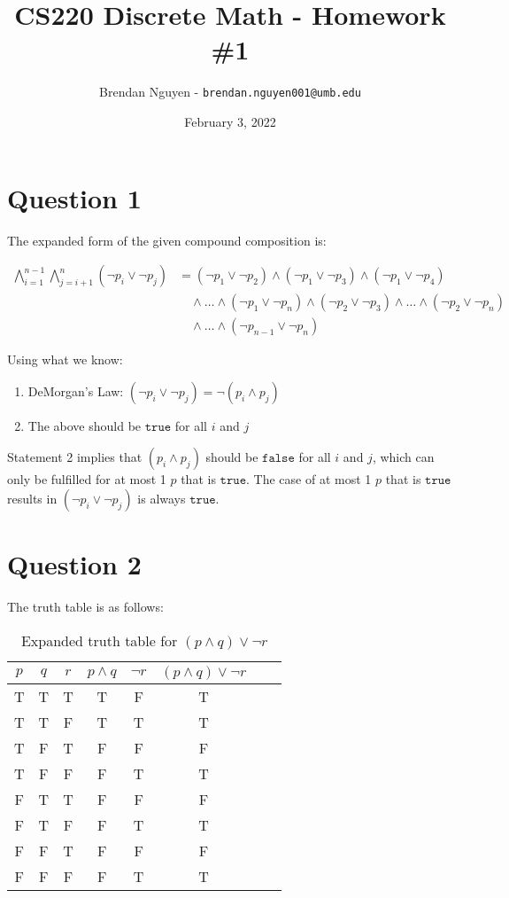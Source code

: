 \documentclass[11pt]{article}
\title{CS220 Discrete Math - Homework \#1}
\author{Brendan Nguyen - \texttt{brendan.nguyen001@umb.edu}}
\date{February 3, 2022}
\begin{document}
\maketitle

\section*{Question 1}
The expanded form of the given compound composition is:

\begin{equation*}
    \begin{split}
        \bigwedge_{i=1}^{n-1} \bigwedge_{j=i+1}^n (\neg p_i \vee \neg p_j) &= (\neg p_1 \vee \neg p_2) \wedge (\neg p_1 \vee \neg p_3) \wedge (\neg p_1 \vee \neg p_4)\\
        &\quad\wedge \ldots \wedge (\neg p_1 \vee \neg p_n) \wedge (\neg p_2 \vee \neg p_3) \wedge \ldots \wedge (\neg p_2 \vee \neg p_n)\\
        &\quad\wedge \ldots \wedge (\neg p_{n-1} \vee \neg p_n)
    \end{split}
\end{equation*}
	
Using what we know:

\begin{enumerate}
  \item DeMorgan's Law: $(\neg p_i \vee \neg p_j) = \neg (p_i \wedge p_j)$
  \item The above should be $\texttt{true}$ for all $i$ and $j$
\end{enumerate}

Statement 2 implies that $(p_i \wedge p_j)$ should be $\texttt{false}$ for all $i$ and $j$, which can only be fulfilled for at most 1 $p$ that is $\texttt{true}$. The case of at most 1 $p$ that is $\texttt{true}$ results in $(\neg p_i \vee \neg p_j)$ is always $\texttt{true}$.

\section*{Question 2}

The truth table is as follows:
\begin{table}[H]
\centering
    \begin{tabular}{|c c c|c|c|c|c|c|}
    \hline
    $p$ & $q$ & $r$ & $p \wedge q$ & $\neg r$ & $(p \wedge q) \vee \neg r$ \\ \hline
    T & T & T & T & F & T\\ \hline
    T & T & F & T & T & T\\ \hline
    T & F & T & F & F & F\\ \hline
    T & F & F & F & T & T\\ \hline
    F & T & T & F & F & F\\ \hline
    F & T & F & F & T & T\\ \hline
    F & F & T & F & F & F\\ \hline
    F & F & F & F & T & T\\ \hline
    \end{tabular}
    \caption{Expanded truth table for $(p \wedge q) \vee \neg r$}
    \label{table:1}
\end{table}
\end{document}
